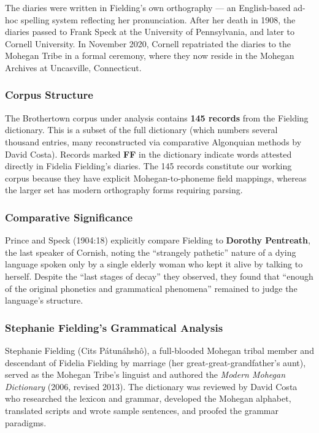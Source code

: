 The diaries were written in Fielding's own orthography --- an English-based
ad-hoc spelling system reflecting her pronunciation. After her death in 1908,
the diaries passed to Frank Speck at the University of Pennsylvania, and later
to Cornell University. In November 2020, Cornell repatriated the diaries to
the Mohegan Tribe in a formal ceremony, where they now reside in the Mohegan
Archives at Uncasville, Connecticut.

\subsubsection{Corpus Structure}

The Brothertown corpus under analysis contains \textbf{145 records} from the
Fielding dictionary. This is a subset of the full dictionary (which numbers
several thousand entries, many reconstructed via comparative Algonquian
methods by David Costa). Records marked \textbf{FF} in the dictionary
indicate words attested directly in Fidelia Fielding's diaries. The 145
records constitute our working corpus because they have explicit
Mohegan-to-phoneme field mappings, whereas the larger set has modern
orthography forms requiring parsing.

\subsubsection{Comparative Significance}

Prince and Speck (1904:18) explicitly compare Fielding to \textbf{Dorothy
Pentreath}, the last speaker of Cornish, noting the ``strangely pathetic''
nature of a dying language spoken only by a single elderly woman who kept it
alive by talking to herself. Despite the ``last stages of decay'' they
observed, they found that ``enough of the original phonetics and grammatical
phenomena'' remained to judge the language's structure.

\subsubsection{Stephanie Fielding's Grammatical Analysis}

Stephanie Fielding (Cits Pátunáhshô), a full-blooded Mohegan tribal member
and descendant of Fidelia Fielding by marriage (her great-great-grandfather's
aunt), served as the Mohegan Tribe's linguist and authored the \emph{Modern
Mohegan Dictionary} (2006, revised 2013). The dictionary was reviewed by David
Costa who researched the lexicon and grammar, developed the Mohegan alphabet,
translated scripts and wrote sample sentences, and proofed the grammar
paradigms.

